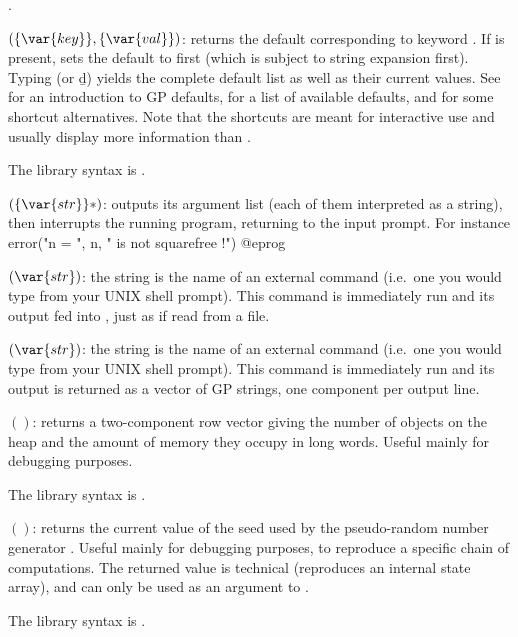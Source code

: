 .

$(\{\var{key}\},\{\var{val}\})$: \label{se:default}returns the default corresponding to keyword . If  is
present, sets the default to  first (which is subject to string
expansion first). Typing  (or \b{d}) yields the complete
default list as well as their current values. See  for an
introduction to GP defaults,  for a
list of available defaults, and  for some shortcut
alternatives. Note that the shortcuts are meant for interactive use and
usually display more information than .

The library syntax is .

$(\{\var{str}\}*)$: \label{se:error}outputs its argument list (each of
them interpreted as a string), then interrupts the running  program,
returning to the input prompt. For instance
\bprog
error("n = ", n, " is not squarefree !")
@eprog\noindent

$(\var{str})$: \label{se:extern}the string  is the name of an external command (i.e.~one you
would type from your UNIX shell prompt). This command is immediately run and
its output fed into , just as if read from a file.

$(\var{str})$: \label{se:externstr}the string  is the name of an external command (i.e.~one you
would type from your UNIX shell prompt). This command is immediately run and
its output is returned as a vector of GP strings, one component per output
line.

$()$: \label{se:getheap}returns a two-component row vector giving the
number of objects on the heap and the amount of memory they occupy in long
words. Useful mainly for debugging purposes.

The library syntax is .

$()$: \label{se:getrand}returns the current value of the seed used by the
pseudo-random number generator . Useful mainly for debugging
purposes, to reproduce a specific chain of computations. The returned value
is technical (reproduces an internal state array), and can only be used as an
argument to .

The library syntax is .

